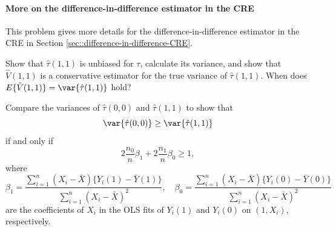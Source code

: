 
%
%
%
%
%
%


\paragraph{More on the difference-in-difference estimator in the CRE}\label{hw::did-CRE}

This problem gives more details for the difference-in-difference estimator in the CRE in Section \ref{sec::difference-in-difference-CRE}. 

Show that $\hat{\tau}(1,1) $ is unbiased for $\tau$, calculate its variance, and show that $\hat{V}( 1,1 ) $ is a conservative estimator for the true variance of $\hat{\tau}(1,1) $. When does $E\{\hat{V}( 1,1 ) \} = \var\{  \hat{\tau}(1,1)  \}$ hold?



Compare the variances of $\hat{\tau}(0,0) $ and $\hat{\tau}(1,1) $ to show that 
$$
\var\{ \hat{\tau}(0,0) \}  \geq \var\{  \hat{\tau}(1,1)  \}
$$
if and only if 
$$
2 \frac{n_0}{n} \beta_1 + 2\frac{n_1}{n} \beta_0 \geq 1,
$$
where 
$$
\beta_1 = \frac{\sum_{i=1}^n (X_i-\bar{X})\{  Y_i(1)-\bar{Y}(1) \}  }{  \sum_{i=1}^n (X_i-\bar{X})^2 },\quad
\beta_0 = \frac{\sum_{i=1}^n (X_i-\bar{X})\{  Y_i(0)-\bar{Y}(0) \}  }{  \sum_{i=1}^n (X_i-\bar{X})^2 }
$$
are the coefficients of $X_i$ in the OLS fits of $Y_i(1)$ and $Y_i(0)$ on $(1,X_i)$, respectively. 


